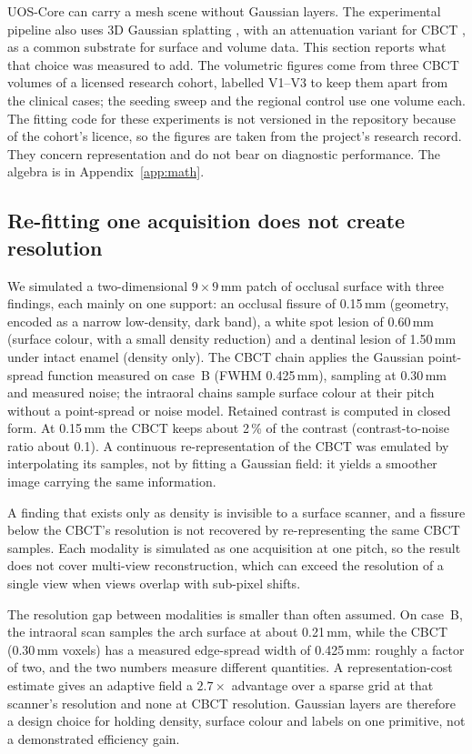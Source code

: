 \documentclass[11pt,a4paper]{article}
\newenvironment{finding}[1]
 {\par\medskip\noindent{\color{uosblue}\rule{\linewidth}{0.9pt}}\par\nobreak\vspace{3pt}
  \noindent{\bfseries\color{uosblue}#1}\par\nobreak\vspace{2pt}}
 {\par\vspace{2pt}\noindent{\color{uosrule}\rule{\linewidth}{0.6pt}}\par\medskip}
\begin{document}
UOS-Core can carry a mesh scene without Gaussian layers. The experimental pipeline also uses
3D Gaussian splatting \cite{kerbl2023}, with an attenuation variant for CBCT
\cite{xgaussian,r2gaussian}, as a common substrate for surface and volume data. This
section reports what that choice was measured to add. The volumetric figures come from three
CBCT volumes of a licensed research cohort, labelled V1--V3 to keep them apart from the
clinical cases; the seeding sweep and the regional control use one volume each. The fitting
code for these experiments is not versioned in the repository because of the cohort's
licence, so the figures are taken from the project's research record. They concern
representation and do not bear on diagnostic performance. The algebra is in
Appendix~\ref{app:math}.

\subsection{Re-fitting one acquisition does not create resolution}

We simulated a two-dimensional $9\times9$\,mm patch of occlusal surface with three findings,
each mainly on one support: an occlusal fissure of 0.15\,mm (geometry, encoded as a narrow
low-density, dark band), a white spot lesion of 0.60\,mm (surface colour, with a small
density reduction) and a dentinal lesion of 1.50\,mm under intact enamel (density only). The
CBCT chain applies the Gaussian point-spread function measured on case~B (FWHM 0.425\,mm),
sampling at 0.30\,mm and measured noise; the intraoral chains sample surface colour at their
pitch without a point-spread or noise model. Retained contrast is computed in closed form. At 0.15\,mm the
CBCT keeps about 2\,\% of the contrast (contrast-to-noise ratio about 0.1). A continuous
re-representation of the CBCT was emulated by interpolating its samples, not by fitting a
Gaussian field: it yields a smoother image carrying the same information.

\begin{finding}{Scope of this result}
A finding that exists only as density is invisible to a surface scanner, and a fissure
below the CBCT's resolution is not recovered by re-representing the same CBCT samples. Each
modality is simulated as one acquisition at one pitch, so the result does not cover
multi-view reconstruction, which can exceed the resolution of a single view when views
overlap with sub-pixel shifts.

The resolution gap between modalities is smaller than often assumed. On case~B, the
intraoral scan samples the arch surface at about 0.21\,mm, while the CBCT (0.30\,mm voxels)
has a measured edge-spread width of 0.425\,mm: roughly a factor of two, and the two numbers
measure different quantities. A representation-cost estimate gives an adaptive field a
$2.7\times$ advantage over a sparse grid at that scanner's resolution and none at CBCT
resolution. Gaussian layers are therefore a design choice for holding density, surface
colour and labels on one primitive, not a demonstrated efficiency gain.
\end{finding}
\end{document}
